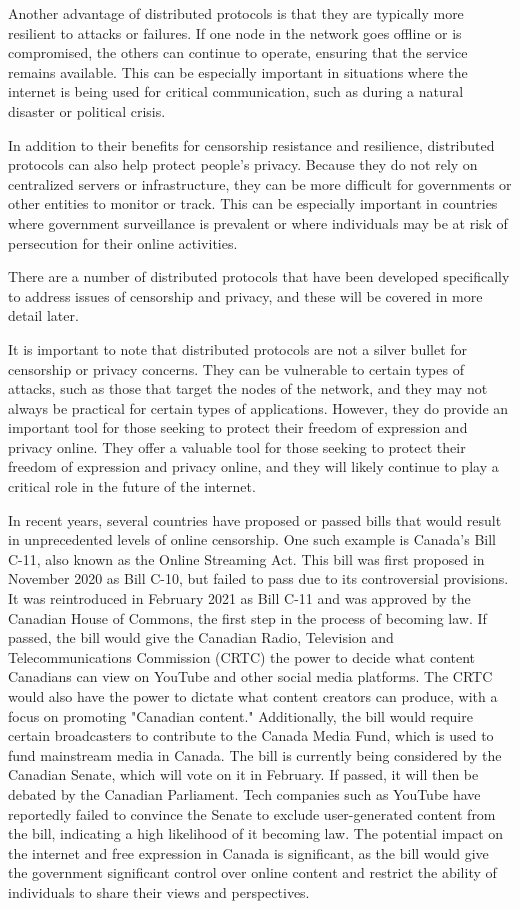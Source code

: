 Another advantage of distributed protocols is that they are typically more resilient to attacks or failures. If one node in the network goes offline or is compromised, the others can continue to operate, ensuring that the service remains available. This can be especially important in situations where the internet is being used for critical communication, such as during a natural disaster or political crisis.\par
In addition to their benefits for censorship resistance and resilience, distributed protocols can also help protect people's privacy. Because they do not rely on centralized servers or infrastructure, they can be more difficult for governments or other entities to monitor or track. This can be especially important in countries where government surveillance is prevalent or where individuals may be at risk of persecution for their online activities.\par 
There are a number of distributed protocols that have been developed specifically to address issues of censorship and privacy, and these will be covered in more detail later.\par
It is important to note that distributed protocols are not a silver bullet for censorship or privacy concerns. They can be vulnerable to certain types of attacks, such as those that target the nodes of the network, and they may not always be practical for certain types of applications. However, they do provide an important tool for those seeking to protect their freedom of expression and privacy online. They offer a valuable tool for those seeking to protect their freedom of expression and privacy online, and they will likely continue to play a critical role in the future of the internet.\par
In recent years, several countries have proposed or passed bills that would result in unprecedented levels of online censorship. One such example is Canada's Bill C-11, also known as the Online Streaming Act. This bill was first proposed in November 2020 as Bill C-10, but failed to pass due to its controversial provisions. It was reintroduced in February 2021 as Bill C-11 and was approved by the Canadian House of Commons, the first step in the process of becoming law. If passed, the bill would give the Canadian Radio, Television and Telecommunications Commission (CRTC) the power to decide what content Canadians can view on YouTube and other social media platforms. The CRTC would also have the power to dictate what content creators can produce, with a focus on promoting "Canadian content." Additionally, the bill would require certain broadcasters to contribute to the Canada Media Fund, which is used to fund mainstream media in Canada. The bill is currently being considered by the Canadian Senate, which will vote on it in February. If passed, it will then be debated by the Canadian Parliament. Tech companies such as YouTube have reportedly failed to convince the Senate to exclude user-generated content from the bill, indicating a high likelihood of it becoming law. The potential impact on the internet and free expression in Canada is significant, as the bill would give the government significant control over online content and restrict the ability of individuals to share their views and perspectives.\par
